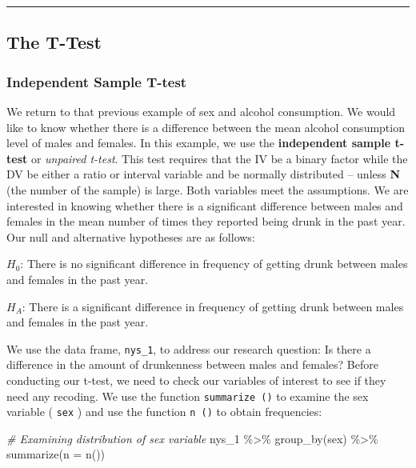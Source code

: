 \documentclass[
]{book}
\newenvironment{Shaded}{\begin{snugshade}}{\end{snugshade}}
\newcommand{\AttributeTok}[1]{\textcolor[rgb]{0.77,0.63,0.00}{#1}}
\newcommand{\CommentTok}[1]{\textcolor[rgb]{0.56,0.35,0.01}{\textit{#1}}}
\newcommand{\FunctionTok}[1]{\textcolor[rgb]{0.00,0.00,0.00}{#1}}
\newcommand{\NormalTok}[1]{#1}
\newcommand{\SpecialCharTok}[1]{\textcolor[rgb]{0.00,0.00,0.00}{#1}}
\begin{document}
\begin{center}\rule{0.5\linewidth}{0.5pt}\end{center}

\hypertarget{the-t-test}{%
\subsection{The T-Test}\label{the-t-test}}

\hypertarget{independent-sample-t-test}{%
\subsubsection{Independent Sample T-test}\label{independent-sample-t-test}}

We return to that previous example of sex and alcohol consumption. We would like to know whether there is a difference between the mean alcohol consumption level of males and females. In this example, we use the \textbf{independent sample t-test} or \emph{unpaired t-test}. This test requires that the IV be a binary factor while the DV be either a ratio or interval variable and be normally distributed -- unless \textbf{N} (the number of the sample) is large. Both variables meet the assumptions. We are interested in knowing whether there is a significant difference between males and females in the mean number of times they reported being drunk in the past year. Our null and alternative hypotheses are as follows:

\(H_0\): There is no significant difference in frequency of getting drunk between males and females in the past year.

\(H_A\): There is a significant difference in frequency of getting drunk between males and females in the past year.

We use the data frame, \texttt{nys\_1}, to address our research question: Is there a difference in the amount of drunkenness between males and females? Before conducting our t-test, we need to check our variables of interest to see if they need any recoding. We use the function \texttt{summarize\ ()} to examine the sex variable ( \texttt{sex} ) and use the function \texttt{n\ ()} to obtain frequencies:

\begin{Shaded}
\begin{Highlighting}[]
\CommentTok{\# Examining distribution of sex variable}
\NormalTok{nys\_1 }\SpecialCharTok{\%\textgreater{}\%} \FunctionTok{group\_by}\NormalTok{(sex) }\SpecialCharTok{\%\textgreater{}\%} \FunctionTok{summarize}\NormalTok{(}\AttributeTok{n =} \FunctionTok{n}\NormalTok{())}
\end{Highlighting}
\end{Shaded}
\end{document}
